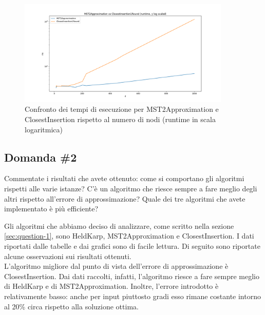 \begin{figure}[H]
    \centering

    \includegraphics[width=0.9\textwidth]{./images/MST2Approximation_vs_ClosestInsertion1Round__runtime__y_log_scaled_.png}

    \caption{Confronto dei tempi di esecuzione per MST2Approximation e ClosestInsertion rispetto al numero di nodi (runtime in scala logaritmica)}
    \label{fig:mst2approx-closestinsertion-runtime}
\end{figure}

\subsection{Domanda \#2}
\label{sec:question-2}

\begin{displayquote}
Commentate i risultati che avete ottenuto: come si comportano gli
algoritmi rispetti alle varie istanze? C'è un algoritmo che riesce
sempre a fare meglio degli altri rispetto all'errore di
approssimazione? Quale dei tre algoritmi che avete implementato è
più efficiente?
\end{displayquote}

\noindent Gli algoritmi che abbiamo deciso di analizzare, come scritto
nella sezione \ref{sec:question-1}, sono HeldKarp, MST2Approximation e
ClosestInsertion. I dati riportati dalle tabelle e dai grafici sono di
facile lettura. Di seguito sono riportate alcune osservazioni sui
risultati ottenuti. \\

\noindent L'algoritmo migliore dal punto di vista dell'errore di
approssimazione è ClosestInsertion. Dai dati raccolti, infatti,
l'algoritmo riesce a fare sempre meglio di HeldKarp e di
MST2Approximation. Inoltre, l'errore introdotto è relativamente basso:
anche per input piuttosto gradi esso rimane costante intorno al 20\%
circa rispetto alla soluzione ottima. \\

